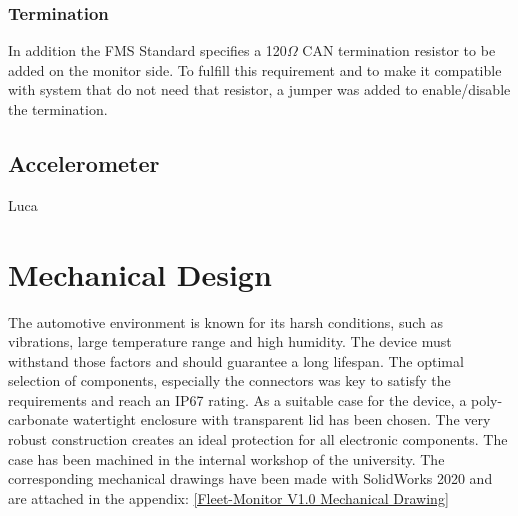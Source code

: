 \subsubsection{Termination}
In addition the FMS Standard specifies a 120$\Omega$ CAN termination resistor to be added on the monitor side. To fulfill this requirement and to make it compatible with system that do not need that resistor, a jumper was added to enable/disable the termination.   
\subsection{Accelerometer}
Luca

\newpage
\section{Mechanical Design}
The automotive environment is known for its harsh conditions, such as vibrations, large temperature range and high humidity. The device must withstand those factors and should guarantee a long lifespan. The optimal selection of components, especially the connectors was key to satisfy the requirements and reach an IP67 rating.\newline
As a suitable case for the device, a poly-carbonate watertight enclosure with transparent lid has been chosen. The very robust construction creates an ideal protection for all electronic components.\newline
The case has been machined in the internal workshop of the university. The corresponding mechanical drawings have been made with SolidWorks 2020 and are attached in the appendix: \ref{Fleet-Monitor V1.0 Mechanical Drawing}

